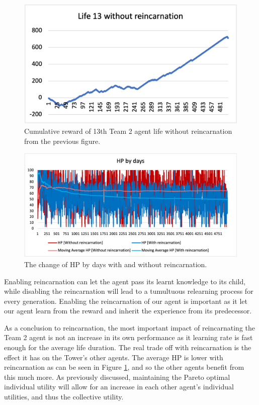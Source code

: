 \begin{figure}
\centering
\includegraphics{004_team_2_agent_design/cum13team2}
\caption{Cumulative reward of 13th Team 2 agent life without reincarnation from the previous figure.}
\end{figure}

\begin{figure}
\centering
\includegraphics{004_team_2_agent_design/hpdaysteam2}
\caption{The change of HP by days with and without reincarnation.}
\label{hpdaysteam2}
\end{figure}

Enabling reincarnation can let the agent pass its learnt knowledge to its child, while disabling the reincarnation will lead to a tumultuous relearning process for every generation. Enabling the reincarnation of our agent is important as it let our agent learn from the reward and inherit the experience from its predecessor. 

As a conclusion to reincarnation, the most important impact of reincarnating the Team 2 agent is not an increase in its own performance as it learning rate is fast enough for the average life duration. The real trade off with reincarnation is the effect it has on the Tower’s other agents. The average HP is lower with reincarnation as can be seen in Figure \ref{hpdaysteam2}, and so the other agents benefit from this much more. As previously discussed, maintaining the Pareto optimal individual utility will allow for an increase in each other agent’s individual utilities, and thus the collective utility.

